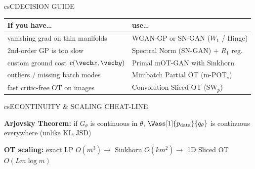 \documentclass[../../../../master.tex]{subfiles}
\begin{document}
\begin{cscolumns}
\begin{cscard}{csC}{DECISION GUIDE}
  \renewcommand{\arraystretch}{1.22}\small
  \begin{tabular}{@{}>{\raggedright\arraybackslash}p{3.1cm}>{\raggedright\arraybackslash}p{4.6cm}@{}}
    \textbf{If you have\ldots} & \textbf{use\ldots}\\ \hline
    vanishing grad on thin manifolds & WGAN-GP or SN-GAN ($W_1$ / Hinge)\\
    2nd-order GP is too slow & Spectral Norm (SN-GAN) + $R_1$ reg.\\
    custom ground cost $c(\vecb x,\vecb y)$ & Primal mOT-GAN with Sinkhorn\\
    outliers / missing batch modes & Minibatch Partial OT ($\mathrm{m\text{-}POT}_s$)\\
    fast critic-free OT on images & Convolution Sliced-OT ($\mathrm{SW}_p$)\\
  \end{tabular}
\end{cscard}

\begin{cscard}{csE}{CONTINUITY \& SCALING CHEAT-LINE}
  \begin{csbul}
    \item \textbf{Arjovsky Theorem:} if $G_\theta$ is continuous in $\theta$, $\Wass[1]{p_{\mathrm{data}}}{q_\theta}$ is continuous everywhere (unlike $\mathrm{KL},\mathrm{JSD}$)
    \item \textbf{OT scaling:} exact LP $O(m^3)\to$ Sinkhorn $O(km^2)\to$ 1D Sliced OT $O(Lm\log m)$
  \end{csbul}
\end{cscard}


\end{cscolumns}
\end{document}

